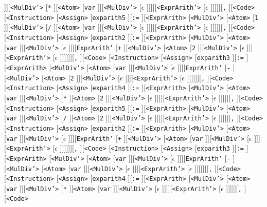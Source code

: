 \documentclass[border=5pt]{standalone}
\begin{document}
]][{\texttt{<MulDiv'>}} [{\texttt{*}} ][{\texttt{<Atom>}} [{\texttt{var}} ]][{\texttt{<MulDiv'>}} [{$\epsilon$} ]]]][{\texttt{<ExprArith'>}} [{$\epsilon$} ]]]]][{\texttt{,}} ][{\texttt{<Code>}} [{\texttt{<Instruction>}} [{\texttt{<Assign>}} [{\texttt{exparith5}} ][{\texttt{:=}} ][{\texttt{<ExprArith>}} [{\texttt{<MulDiv'>}} [{\texttt{<Atom>}} [{\texttt{1}} ]][{\texttt{<MulDiv'>}} [{\texttt{/}} ][{\texttt{<Atom>}} [{\texttt{var}} ]][{\texttt{<MulDiv'>}} [{$\epsilon$} ]]]][{\texttt{<ExprArith'>}} [{$\epsilon$} ]]]]][{\texttt{,}} ][{\texttt{<Code>}} [{\texttt{<Instruction>}} [{\texttt{<Assign>}} [{\texttt{exparith2}} ][{\texttt{:=}} ][{\texttt{<ExprArith>}} [{\texttt{<MulDiv'>}} [{\texttt{<Atom>}} [{\texttt{var}} ]][{\texttt{<MulDiv'>}} [{$\epsilon$} ]]][{\texttt{ExprArith'}} [{\texttt{+}} ][{\texttt{<MulDiv'>}} [{\texttt{<Atom>}} [{\texttt{2}} ]][{\texttt{<MulDiv'>}} [{$\epsilon$} ]]][{\texttt{<ExprArith'>}} [{$\epsilon$} ]]]]]][{\texttt{,}} ][{\texttt{<Code>}} [{\texttt{<Instruction>}} [{\texttt{<Assign>}} [{\texttt{exparith3}} ][{\texttt{:=}} ][{\texttt{<ExprArith>}} [{\texttt{<MulDiv'>}} [{\texttt{<Atom>}} [{\texttt{var}} ]][{\texttt{<MulDiv'>}} [{$\epsilon$} ]]][{\texttt{ExprArith'}} [{\texttt{-}} ][{\texttt{<MulDiv'>}} [{\texttt{<Atom>}} [{\texttt{2}} ]][{\texttt{<MulDiv'>}} [{$\epsilon$} ]]][{\texttt{<ExprArith'>}} [{$\epsilon$} ]]]]]][{\texttt{,}} ][{\texttt{<Code>}} [{\texttt{<Instruction>}} [{\texttt{<Assign>}} [{\texttt{exparith4}} ][{\texttt{:=}} ][{\texttt{<ExprArith>}} [{\texttt{<MulDiv'>}} [{\texttt{<Atom>}} [{\texttt{var}} ]][{\texttt{<MulDiv'>}} [{\texttt{*}} ][{\texttt{<Atom>}} [{\texttt{2}} ]][{\texttt{<MulDiv'>}} [{$\epsilon$} ]]]][{\texttt{<ExprArith'>}} [{$\epsilon$} ]]]]][{\texttt{,}} ][{\texttt{<Code>}} [{\texttt{<Instruction>}} [{\texttt{<Assign>}} [{\texttt{exparith5}} ][{\texttt{:=}} ][{\texttt{<ExprArith>}} [{\texttt{<MulDiv'>}} [{\texttt{<Atom>}} [{\texttt{var}} ]][{\texttt{<MulDiv'>}} [{\texttt{/}} ][{\texttt{<Atom>}} [{\texttt{2}} ]][{\texttt{<MulDiv'>}} [{$\epsilon$} ]]]][{\texttt{<ExprArith'>}} [{$\epsilon$} ]]]]][{\texttt{,}} ][{\texttt{<Code>}} [{\texttt{<Instruction>}} [{\texttt{<Assign>}} [{\texttt{exparith2}} ][{\texttt{:=}} ][{\texttt{<ExprArith>}} [{\texttt{<MulDiv'>}} [{\texttt{<Atom>}} [{\texttt{var}} ]][{\texttt{<MulDiv'>}} [{$\epsilon$} ]]][{\texttt{ExprArith'}} [{\texttt{+}} ][{\texttt{<MulDiv'>}} [{\texttt{<Atom>}} [{\texttt{var}} ]][{\texttt{<MulDiv'>}} [{$\epsilon$} ]]][{\texttt{<ExprArith'>}} [{$\epsilon$} ]]]]]][{\texttt{,}} ][{\texttt{<Code>}} [{\texttt{<Instruction>}} [{\texttt{<Assign>}} [{\texttt{exparith3}} ][{\texttt{:=}} ][{\texttt{<ExprArith>}} [{\texttt{<MulDiv'>}} [{\texttt{<Atom>}} [{\texttt{var}} ]][{\texttt{<MulDiv'>}} [{$\epsilon$} ]]][{\texttt{ExprArith'}} [{\texttt{-}} ][{\texttt{<MulDiv'>}} [{\texttt{<Atom>}} [{\texttt{var}} ]][{\texttt{<MulDiv'>}} [{$\epsilon$} ]]][{\texttt{<ExprArith'>}} [{$\epsilon$} ]]]]]][{\texttt{,}} ][{\texttt{<Code>}} [{\texttt{<Instruction>}} [{\texttt{<Assign>}} [{\texttt{exparith4}} ][{\texttt{:=}} ][{\texttt{<ExprArith>}} [{\texttt{<MulDiv'>}} [{\texttt{<Atom>}} [{\texttt{var}} ]][{\texttt{<MulDiv'>}} [{\texttt{*}} ][{\texttt{<Atom>}} [{\texttt{var}} ]][{\texttt{<MulDiv'>}} [{$\epsilon$} ]]]][{\texttt{<ExprArith'>}} [{$\epsilon$} ]]]]][{\texttt{,}} ][{\texttt{<Code>}} 
\end{document}
